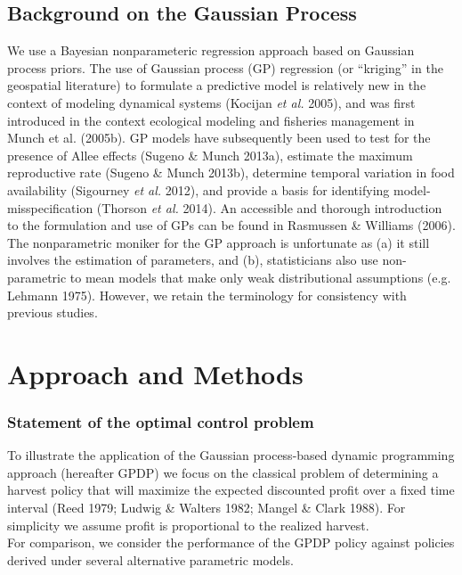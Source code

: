 \documentclass[author-year, 12pt,review]{elsarticle} %
\begin{document}
\subsection{Background on the Gaussian
Process}\label{background-on-the-gaussian-process}

We use a Bayesian nonparameteric regression approach based on Gaussian
process priors. The use of Gaussian process (GP) regression (or
``kriging'' in the geospatial literature) to formulate a predictive
model is relatively new in the context of modeling dynamical systems
(Kocijan \emph{et al.} 2005), and was first introduced in the context
ecological modeling and fisheries management in Munch et al. (2005b). GP
models have subsequently been used to test for the presence of Allee
effects (Sugeno \& Munch 2013a), estimate the maximum reproductive rate
(Sugeno \& Munch 2013b), determine temporal variation in food
availability (Sigourney \emph{et al.} 2012), and provide a basis for
identifying model-misspecification (Thorson \emph{et al.} 2014). An
accessible and thorough introduction to the formulation and use of GPs
can be found in Rasmussen \& Williams (2006). The nonparametric moniker
for the GP approach is unfortunate as (a) it still involves the
estimation of parameters, and (b), statisticians also use non-parametric
to mean models that make only weak distributional assumptions (e.g.
Lehmann 1975). However, we retain the terminology for consistency with
previous studies.

\section{Approach and Methods}\label{approach-and-methods}

\subsubsection{Statement of the optimal control
problem}\label{statement-of-the-optimal-control-problem}

To illustrate the application of the Gaussian process-based dynamic
programming approach (hereafter GPDP) we focus on the classical problem
of determining a harvest policy that will maximize the expected
discounted profit over a fixed time interval (Reed 1979; Ludwig \&
Walters 1982; Mangel \& Clark 1988). For simplicity we assume profit is
proportional to the realized harvest.\\For comparison, we consider the
performance of the GPDP policy against policies derived under several
alternative parametric models.
\end{document}
